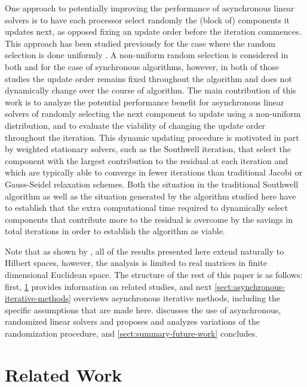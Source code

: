 \documentclass{article}
\theoremstyle{definition}
\theoremstyle{example}
\theoremstyle{example}
\theoremstyle{example}
\begin{document}
One approach to potentially improving the performance of asynchronous linear solvers is to have each processor select randomly the (block of) components it updates next, as opposed fixing an update order before the iteration commences. This approach has been studied previously for the case where the random selection is done uniformly \cite{strikwerda2002probabilistic,avron2015revisiting}. A non-uniform random selection is considered in both \cite{leventhal2010randomized} and \cite{griebel2012greedy} for the case of synchronous algorithms, however, in both of those studies the update order remains fixed throughout the algorithm and does not dynamically change over the course of algorithm. The main contribution of this work is to analyze the potential performance benefit for asynchronous linear solvers of randomly selecting the next component to update using a non-uniform distribution, and to evaluate the viability of changing the update order throughout the iteration. This dynamic updating procedure is motivated in part by weighted stationary solvers, such as the Southwell iteration, that select the component with the largest contribution to the residual at each iteration and which are typically able to converge in fewer iterations than traditional Jacobi or Gauss-Seidel relaxation schemes. Both the situation in the traditional Southwell algorithm as well as the situation generated by the algorithm studied here have to establish that the extra computational time required to dynamically select components that contribute more to the residual is overcome by the savings in total iterations in order to establish the algorithm as viable.

Note that as shown by \cite{griebel2012greedy}, all of the results presented here extend naturally to Hilbert spaces, however, the analysis is limited to real matrices in finite dimensional Euclidean space. The structure of the rest of this paper is as follows: first, \cref{sect:related-work} provides information on related studies, and next \cref{sect:asynchronous-iterative-methods} overviews asynchronous iterative methods, including the specific assumptions that are made here.  discusses the use of asynchronous, randomized linear solvers and proposes and analyzes variations of the randomization procedure, and \cref{sect:summary-future-work} concludes.


%
\section{Related Work}
\label{sect:related-work}
\end{document}
